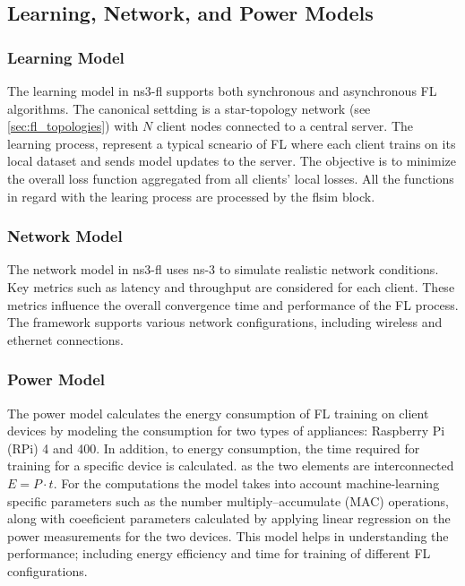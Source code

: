 \subsection{Learning, Network, and Power Models}
\subsubsection{Learning Model}
The learning model in ns3-fl supports both synchronous and asynchronous FL algorithms. The canonical settding is a star-topology network
(see \cref{sec:fl_topologies}) with $N$ client nodes connected to a central server. The learning process, represent a typical scneario of FL where
each client trains on its local dataset and sends model updates to the server. The objective is to minimize the overall loss function aggregated from all
clients' local losses. All the functions in regard with the learing process are processed by the flsim block.

\subsubsection{Network Model}
The network model in ns3-fl uses ns-3 to simulate realistic network conditions. Key metrics such as latency and throughput are considered
for each client. These metrics influence the overall convergence time and performance of the FL process. The framework supports various
network configurations, including wireless and ethernet connections.


\subsubsection{Power Model}
The power model calculates the energy consumption of FL training on client devices by modeling the consumption for two types of appliances:
Raspberry Pi (RPi) 4 and 400. In addition, to energy consumption, the time required for training for a specific device is calculated.
as the two elements are interconnected $E=P \cdot t$. For the computations the model takes into account machine-learning specific parameters such as the number
multiply–accumulate (MAC) operations, along with coeeficient parameters calculated by applying linear regression on the power measurements
for the two devices. This model helps in understanding the performance; including energy efficiency and time for training of different FL configurations.

